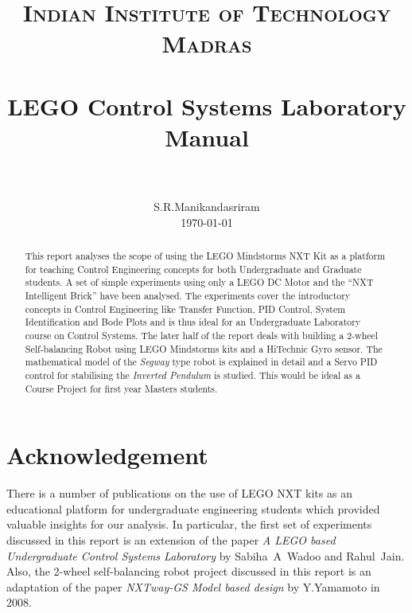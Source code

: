 \documentclass[paper=a4, fontsize=11pt]{scrartcl}
\title{
        \usefont{OT1}{bch}{b}{n}
        \normalfont \normalsize \textsc{Indian Institute of Technology Madras} \\ [25pt]
        \horrule{0.5pt} \\[0.4cm]
        \huge LEGO Control Systems Laboratory Manual \\
        \horrule{2pt} \\[0.5cm]
}
\author{
        \normalfont                                 \normalsize
        S.R.Manikandasriram\\[-3pt]      \normalsize
        \today
}
\date{}
\numberwithin{equation}{section}        %
\numberwithin{figure}{section}          %
\numberwithin{table}{section}           %
\begin{document}
\maketitle

\begin{abstract}
This report analyses the scope of using the LEGO Mindstorms NXT Kit as a platform for teaching Control Engineering concepts for both Undergraduate and Graduate students. A set of simple experiments using only a LEGO DC Motor and the ``NXT Intelligent Brick'' have been analysed. The experiments cover the introductory concepts in Control Engineering like Transfer Function, PID Control, System Identification and Bode Plots and is thus ideal for an Undergraduate Laboratory course on Control Systems. The later half of the report deals with building a 2-wheel Self-balancing Robot using LEGO Mindstorms kits and a HiTechnic Gyro sensor. The mathematical model of the \emph{Segway} type robot is explained in detail and a Servo PID control for stabilising the \emph{Inverted Pendulum} is studied. This would be ideal as a Course Project for first year Masters students.
\end{abstract}

\pagebreak

\section*{Acknowledgement}

There is a number of publications on the use of LEGO NXT kits as an educational platform for undergraduate engineering students which provided valuable insights for our analysis. In particular, the first set of experiments discussed in this report is an extension of the paper \emph{A LEGO based Undergraduate Control Systems Laboratory} by Sabiha~A~Wadoo and Rahul~Jain. Also, the 2-wheel self-balancing robot project discussed in this report is an adaptation of the paper \emph{NXTway-GS Model based design} by Y.Yamamoto in 2008.

\pagebreak
\end{document}
